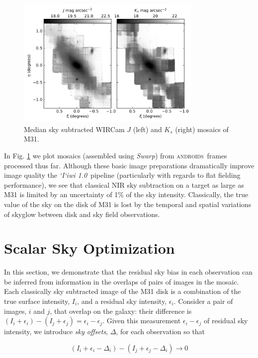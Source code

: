 \documentclass[iop]{emulateapj}
\newcommand{\sw}[1]{\textit{#1}} %
\newcommand{\iiwione}{\sw{`I`iwi 1.0}}
\newcommand{\androids}{\textsc{androids}}
\begin{document}
\begin{figure}[t]
	\centering
		\includegraphics[width=3.5in]{figs/raw_mosaics}
	\caption{Median sky subtracted WIRCam $J$ (left) and $K_s$ (right) mosaics of M31.}
	\label{fig:raw_mosaics}
\end{figure}

In Fig. \ref{fig:raw_mosaics} we plot mosaics (assembled using \sw{Swarp}) from \androids\ frames processed thus far. Although these basic image preparations dramatically improve image quality the \iiwione\ pipeline (particularly with regards to flat fielding performance), we see that classical NIR sky subtraction on a target as large as M31 is limited by an uncertainty of 1\% of the sky intensity. Classically, the true value of the sky on the disk of M31 is lost by the temporal and spatial variations of skyglow between disk and sky field observations.

\section{Scalar Sky Optimization}
\label{sec:scalar}

In this section, we demonstrate that the residual sky bias in each observation can be inferred from information in the overlaps of pairs of images in the mosaic. Each classically sky subtracted image of the M31 disk is a combination of the true surface intensity, $I_i$, and a residual sky intensity, $\epsilon_i$. Consider a pair of images, $i$ and $j$, that overlap on the galaxy: their difference is $(I_i+\epsilon_i) - (I_j+\epsilon_j) = \epsilon_i - \epsilon_j$. Given this measurement $\epsilon_i - \epsilon_j$ of residual sky intensity, we introduce \emph{sky offsets}, $\Delta$, for each observation so that

\begin{equation}
    (I_i + \epsilon_i - \Delta_i) - (I_j + \epsilon_j - \Delta_i) \rightarrow 0
\end{equation}
\end{document}

